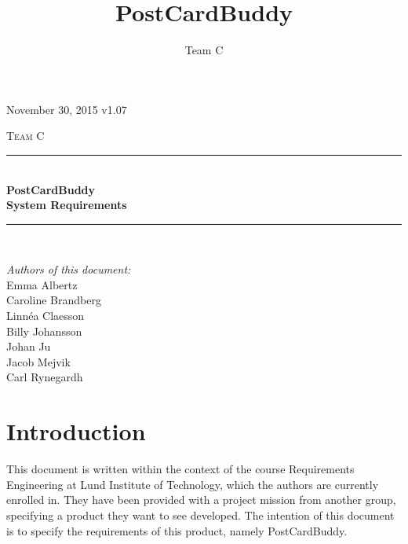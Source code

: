 \documentclass[10pt,a4paper]{article}
\title{PostCardBuddy}
\author{Team C}
\begin{document}
\begin{titlepage}
\newcommand{\HRule}{\rule{\linewidth}{0.5mm}}


\begin{flushright}
November 30, 2015 v1.07\\[3cm]
\end{flushright}


\centering
\textsc{\LARGE Team C}\\[0.5cm]

\HRule \\[0.4cm]
{ \huge \bfseries PostCardBuddy}\\[0.3cm]
{\Large \bfseries System Requirements}\\[0.4cm] %
\HRule \\[1.5cm]

\vfill
\begin{flushleft}
\textit{Authors of this document:}\\
Emma Albertz\\
Caroline Brandberg\\
Linnéa Claesson\\
Billy Johansson\\
Johan Ju\\
Jacob Mejvik\\
Carl Rynegardh
\end{flushleft}

\end{titlepage}



%



\setcounter{tocdepth}{2}
\tableofcontents
\newpage
{}

\section{Introduction}
This document is written within the context of the course Requirements Engineering at Lund Institute of Technology, which the authors are currently enrolled in. They have been provided with a project mission from another group, specifying a product they want to see developed. The intention of this document is to specify the requirements of this product, namely PostCardBuddy.
\end{document}
